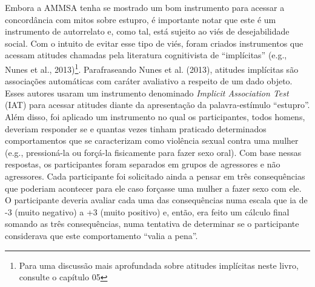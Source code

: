 Embora a AMMSA tenha se mostrado um bom instrumento para acessar a concordância com mitos sobre estupro, é importante notar que este é um instrumento de autorrelato e, como tal, está sujeito ao viés de desejabilidade social. Com o intuito de evitar esse tipo de viés, foram criados instrumentos que acessam atitudes chamadas pela literatura cognitivista de ``implícitas'' (e.g., Nunes et al., 2013)\footnote{Para uma discussão mais aprofundada sobre atitudes implícitas neste livro, consulte o capítulo 05}. Parafraseando Nunes et al. (2013), atitudes implícitas são associações automáticas com caráter avaliativo a respeito de um dado objeto. Esses autores usaram um instrumento denominado \textit{Implicit Association Test} (IAT) para acessar atitudes diante da apresentação da palavra-estímulo ``estupro''. Além disso, foi aplicado um instrumento no qual os participantes, todos homens, deveriam responder se e quantas vezes tinham praticado determinados comportamentos que se caracterizam como violência sexual contra uma mulher (e.g., pressioná-la ou forçá-la fisicamente para fazer sexo oral). Com base nessas respostas, os participantes foram separados em grupos de agressores e não agressores. Cada participante foi solicitado ainda a pensar em três consequências que poderiam acontecer para ele caso forçasse uma mulher a fazer sexo com ele. O participante deveria avaliar cada uma das consequências numa escala que ia de -3 (muito negativo) a +3 (muito positivo) e, então, era feito um cálculo final somando as três consequências, numa tentativa de determinar se o participante considerava que este comportamento ``valia a pena''.


